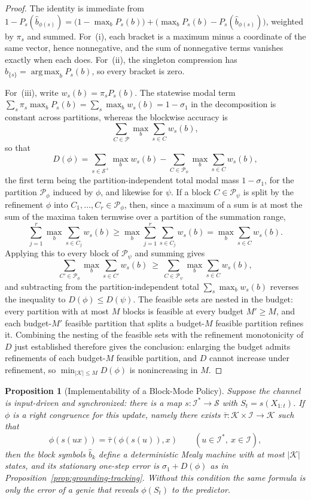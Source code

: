 \documentclass[12pt]{article}
\newtheorem{proposition}[theorem]{Proposition}
\theoremstyle{definition}
\DeclareMathOperator*{\argmax}{arg\,max}
\newcommand{\Splus}{\mathcal S^{+}}
\begin{document}
\begin{proof}
The identity is immediate from
$1-P_s(\hat b_{\phi(s)})=\bigl(1-\max_bP_s(b)\bigr)+\bigl(\max_bP_s(b)-P_s(\hat b_{\phi(s)})\bigr)$,
weighted by $\pi_s$ and summed.  For~(i), each bracket is a maximum minus a
coordinate of the same vector, hence nonnegative, and the sum of nonnegative
terms vanishes exactly when each does.  For~(ii), the singleton compression has
$\hat b_{\{s\}}=\argmax_bP_s(b)$, so every bracket is zero.

For~(iii), write $w_s(b)=\pi_sP_s(b)$.  The statewise modal term
$\sum_s\pi_s\max_bP_s(b)=\sum_s\max_bw_s(b)=1-\sigma_1$ in the decomposition
is constant across partitions, whereas the blockwise accuracy is
\[
\sum_{C\in\mathcal P}\max_b\sum_{s\in C}w_s(b),
\]
so that
\[
D(\phi)=\sum_{s\in\Splus}\max_b w_s(b)-\sum_{C\in\mathcal P_\phi}\max_b\sum_{s\in C}w_s(b),
\]
the first term being the partition-independent total modal mass $1-\sigma_1$,
for the partition $\mathcal P_\phi$ induced by $\phi$, and likewise for
$\psi$.  If a block $C\in\mathcal P_\psi$ is split by the refinement $\phi$
into $C_1,\dots,C_r\in\mathcal P_\phi$, then, since a maximum of a sum is at
most the sum of the maxima taken termwise over a partition of the summation
range,
\[
\sum_{j=1}^r\max_b\sum_{s\in C_j}w_s(b)
\ge
\max_b\sum_{j=1}^r\sum_{s\in C_j}w_s(b)
=
\max_b\sum_{s\in C}w_s(b).
\]
Applying this to every block of $\mathcal P_\psi$ and summing gives
\[
\sum_{C'\in\mathcal P_\phi}\max_b\sum_{s\in C'}w_s(b)
\ \ge\
\sum_{C\in\mathcal P_\psi}\max_b\sum_{s\in C}w_s(b),
\]
and subtracting from the partition-independent total $\sum_s\max_bw_s(b)$
reverses the inequality to $D(\phi)\le D(\psi)$.  The feasible
sets are nested in the budget: every partition with at most $M$ blocks is
feasible at every budget $M'\ge M$, and each budget-$M'$ feasible partition
that splits a budget-$M$ feasible partition refines it.  Combining the
nesting of the feasible sets with the refinement monotonicity of $D$ just
established therefore gives the conclusion: enlarging the budget admits
refinements of each budget-$M$ feasible partition, and $D$ cannot increase
under refinement, so $\min_{|\mathcal K|\le M}D(\phi)$ is nonincreasing in
$M$.
\end{proof}

\begin{proposition}[Implementability of a Block-Mode Policy]
\label{prop:block-mode-implementability}
Suppose the channel is input-driven and synchronized: there is a map
$s:\mathcal I^*\to\mathcal S$ with $S_t=s(X_{1:t})$.  If $\phi$ is a right
congruence for this update, namely there exists
$\bar\tau:\mathcal K\times\mathcal I\to\mathcal K$ such that
\[
\phi(s(ux))=\bar\tau(\phi(s(u)),x)
\qquad(u\in\mathcal I^*,\ x\in\mathcal I),
\]
then the block symbols $\hat b_k$ define a deterministic Mealy machine with
at most $|\mathcal K|$ states, and its stationary one-step error is
$\sigma_1+D(\phi)$ as in Proposition~\ref{prop:grounding-tracking}.  Without
this condition the same formula is only the error of a genie that reveals
$\phi(S_t)$ to the predictor.
\end{proposition}
\end{document}
